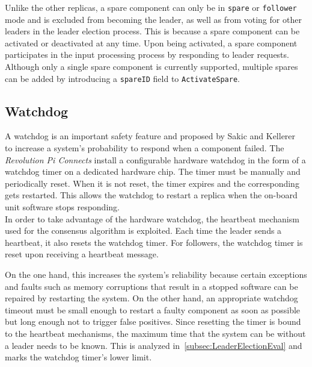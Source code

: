 Unlike the other replicas, a spare component can only be in \texttt{spare} or \texttt{follower} mode and is excluded from becoming the leader, as well as from voting for other leaders in the leader election process.
This is because a spare component can be activated or deactivated at any time.
Upon being activated, a spare component participates in the input processing process by responding to leader requests.
\\

Although only a single spare component is currently supported, multiple spares can be added by introducing a \texttt{spareID} field to \texttt{ActivateSpare}.

\subsection{Watchdog}

A watchdog is an important safety feature and proposed by Sakic and Kellerer~\cite{SakicTimeInConsensus} to increase a system's probability to respond when a component failed.
The \textit{Revolution Pi Connects} install a configurable hardware watchdog in the form of a watchdog timer on a dedicated hardware chip.
The timer must be manually and periodically reset.
When it is not reset, the timer expires and the corresponding  gets restarted.
This allows the watchdog to restart a replica when the on-board unit software stops responding.
\\

In order to take advantage of the hardware watchdog, the heartbeat mechanism used for the consensus algorithm is exploited.
Each time the leader sends a heartbeat, it also resets the watchdog timer.
For followers, the watchdog timer is reset upon receiving a heartbeat message.

On the one hand, this increases the system's reliability because certain exceptions and faults such as memory corruptions that result in a stopped software can be repaired by restarting the system.
On the other hand, an appropriate watchdog timeout must be small enough to restart a faulty component as soon as possible but long enough not to trigger false positives.
Since resetting the timer is bound to the heartbeat mechanisms, the maximum time that the system can be without a leader needs to be known.
This is analyzed in~\autoref{subsec:LeaderElectionEval} and marks the watchdog timer's lower limit.











